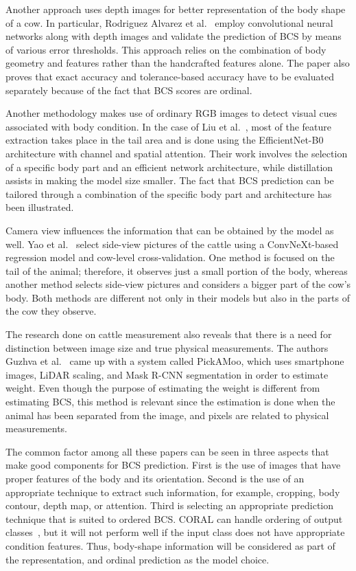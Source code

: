 Another approach uses depth images for better representation of the body shape of a cow. In particular, Rodriguez Alvarez et al.~\cite{rodriguez2018bcs} employ convolutional neural networks along with depth images and validate the prediction of BCS by means of various error thresholds. This approach relies on the combination of body geometry and features rather than the handcrafted features alone. The paper also proves that exact accuracy and tolerance-based accuracy have to be evaluated separately because of the fact that BCS scores are ordinal.

Another methodology makes use of ordinary RGB images to detect visual cues associated with body condition. In the case of Liu et al.~\cite{liu2025vets}, most of the feature extraction takes place in the tail area and is done using the EfficientNet-B0 architecture with channel and spatial attention. Their work involves the selection of a specific body part and an efficient network architecture, while distillation assists in making the model size smaller. The fact that BCS prediction can be tailored through a combination of the specific body part and architecture has been illustrated.

Camera view influences the information that can be obtained by the model as well. Yao et al.~\cite{yao2026jds2} select side-view pictures of the cattle using a ConvNeXt-based regression model and cow-level cross-validation. One method is focused on the tail of the animal; therefore, it observes just a small portion of the body, whereas another method selects side-view pictures and considers a bigger part of the cow's body. Both methods are different not only in their models but also in the parts of the cow they observe.

The research done on cattle measurement also reveals that there is a need for distinction between image size and true physical measurements. The authors Guzhva et al.~\cite{guzhva2026s415} came up with a system called PickAMoo, which uses smartphone images, LiDAR scaling, and Mask R-CNN segmentation in order to estimate weight. Even though the purpose of estimating the weight is different from estimating BCS, this method is relevant since the estimation is done when the animal has been separated from the image, and pixels are related to physical measurements.

The common factor among all these papers can be seen in three aspects that make good components for BCS prediction. First is the use of images that have proper features of the body and its orientation. Second is the use of an appropriate technique to extract such information, for example, cropping, body contour, depth map, or attention. Third is selecting an appropriate prediction technique that is suited to ordered BCS. CORAL can handle ordering of output classes~\cite{coral2020}, but it will not perform well if the input class does not have appropriate condition features. Thus, body-shape information will be considered as part of the representation, and ordinal prediction as the model choice.

